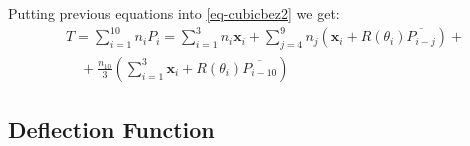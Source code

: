 \documentclass{egpubl}
\begin{document}
Putting previous equations into \eqref{eq-cubicbez2} we get:
%
\begin{equation}\label{global-transform} \begin{split}
    & T = \sum_{i=1}^{10} n_i P_i = \sum_{i=1}^{3} n_i \mathbf{x}_i
    + \sum_{j=4}^9 n_j  \left(
        \mathbf{x}_i + R(\theta_i) \overline{P_{i-j}} \right) + \\
    &\quad + \frac{n_{10}}{3}
        \left( \sum_{i=1}^3 \mathbf{x}_i + R(\theta_i) \overline{P_{i-10}} \right)
    \end{split}
\end{equation}



\subsection{Deflection Function} %
\end{document}
